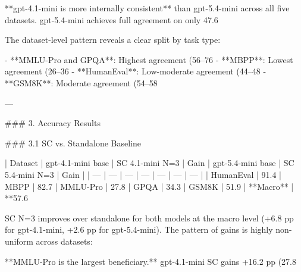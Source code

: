 **gpt-4.1-mini is more internally consistent** than gpt-5.4-mini across all five datasets. gpt-5.4-mini achieves full agreement on only 47.6%

The dataset-level pattern reveals a clear split by task type:

- **MMLU-Pro and GPQA**: Highest agreement (56–76%
- **MBPP**: Lowest agreement (26–36%
- **HumanEval**: Low-moderate agreement (44–48%
- **GSM8K**: Moderate agreement (54–58%

---

### 3. Accuracy Results

### 3.1 SC vs. Standalone Baseline

| Dataset | gpt-4.1-mini base | SC 4.1-mini N=3 | Gain | gpt-5.4-mini base | SC 5.4-mini N=3 | Gain |
| --- | --- | --- | --- | --- | --- | --- |
| HumanEval | 91.4%
| MBPP | 82.7%
| MMLU-Pro | 27.8%
| GPQA | 34.3%
| GSM8K | 51.9%
| **Macro** | **57.6%

SC N=3 improves over standalone for both models at the macro level (+6.8 pp for gpt-4.1-mini, +2.6 pp for gpt-5.4-mini). The pattern of gains is highly non-uniform across datasets:

**MMLU-Pro is the largest beneficiary.** gpt-4.1-mini SC gains +16.2 pp (27.8%

